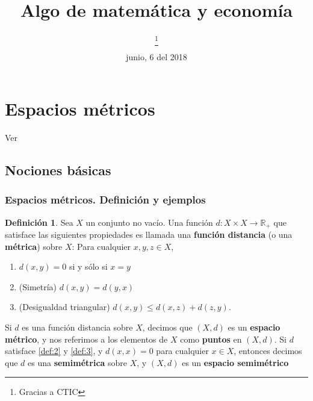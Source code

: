 \documentclass[10pt,a4paper]{article}
\title{\bfseries Algo de matemática y economía}
\author{\color{red}{Juan Pérez}\thanks{Gracias a CTIC}}
\date{junio, 6 del 2018}
\theoremstyle{definition}
\newtheorem{definition}{Definición}
\begin{document}
\maketitle
\tableofcontents
\listoffigures
\listoftables
\thispagestyle{empty}
\section{Espacios métricos}

Ver \cite[Capítulo C]{Ok2007}

\subsection{Nociones básicas}

\subsubsection{Espacios métricos. Definición y ejemplos}

\begin{definition}

Sea $X$ un conjunto no vacío. Una función $d:X\times X\rightarrow\mathbb{R}_{+}$ que satisface las siguientes propiedades es llamada una \textbf{función distancia} (o una \textbf{métrica}) sobre $X$: Para cualquier $x,y,z\in X$,

\begin{enumerate}[label=\arabic*.]

	\item $d(x,y)=0$ si y sólo si $x=y$ \label{def:1}
	
	\item (Simetría) $d(x,y)=d(y,x)$ \label{def:2}
	
	\item (Desigualdad triangular) $d(x,y)\leq d(x,z)+d(z,y)$. \label{def:3}

\end{enumerate}

\end{definition}

Si $d$ es una función distancia sobre $X$, decimos que $(X,d)$ es un \textbf{espacio métrico}, y nos referimos a los elementos \linebreak de $X$ como \textbf{puntos} en $(X,d)$. Si $d$ satisface \ref{def:2} y \ref{def:3}, y $d(x,x)=0$ para cualquier $x\in X$, entonces decimos que $d$ \linebreak es una \textbf{semimétrica} sobre $X$, y $(X,d)$ es un \textbf{espacio semimétrico}
\end{document}
